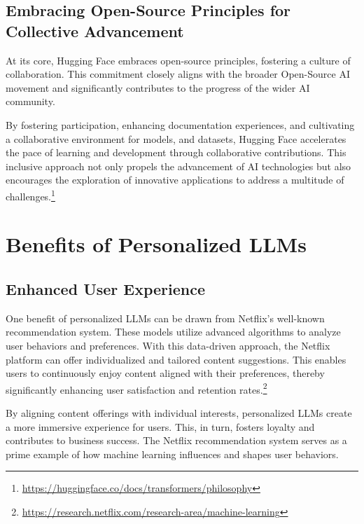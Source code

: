 \documentclass[
]{book}
\begin{document}
\hypertarget{embracing-open-source-principles-for-collective-advancement}{%
\subsection{Embracing Open-Source Principles for Collective Advancement}\label{embracing-open-source-principles-for-collective-advancement}}

At its core, Hugging Face embraces open-source principles, fostering a culture of collaboration. This commitment closely aligns with the broader Open-Source AI movement and significantly contributes to the progress of the wider AI community.

By fostering participation, enhancing documentation experiences, and cultivating a collaborative environment for models, and datasets, Hugging Face accelerates the pace of learning and development through collaborative contributions. This inclusive approach not only propels the advancement of AI technologies but also encourages the exploration of innovative applications to address a multitude of challenges.\footnote{\url{https://huggingface.co/docs/transformers/philosophy}}

\hypertarget{benefits-of-personalized-llms}{%
\section{Benefits of Personalized LLMs}\label{benefits-of-personalized-llms}}

\hypertarget{enhanced-user-experience}{%
\subsection{Enhanced User Experience}\label{enhanced-user-experience}}

One benefit of personalized LLMs can be drawn from Netflix's well-known recommendation system. These models utilize advanced algorithms to analyze user behaviors and preferences. With this data-driven approach, the Netflix platform can offer individualized and tailored content suggestions. This enables users to continuously enjoy content aligned with their preferences, thereby significantly enhancing user satisfaction and retention rates.\footnote{\url{https://research.netflix.com/research-area/machine-learning}}

By aligning content offerings with individual interests, personalized LLMs create a more immersive experience for users. This, in turn, fosters loyalty and contributes to business success. The Netflix recommendation system serves as a prime example of how machine learning influences and shapes user behaviors.
\end{document}
